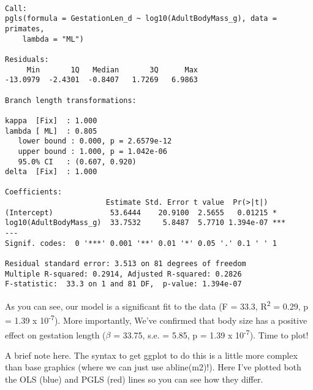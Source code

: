 \documentclass[]{book}
\begin{document}
\begin{verbatim}

Call:
pgls(formula = GestationLen_d ~ log10(AdultBodyMass_g), data = primates, 
    lambda = "ML")

Residuals:
     Min       1Q   Median       3Q      Max 
-13.0979  -2.4301  -0.8407   1.7269   6.9863 

Branch length transformations:

kappa  [Fix]  : 1.000
lambda [ ML]  : 0.805
   lower bound : 0.000, p = 2.6579e-12
   upper bound : 1.000, p = 1.042e-06
   95.0% CI   : (0.607, 0.920)
delta  [Fix]  : 1.000

Coefficients:
                       Estimate Std. Error t value  Pr(>|t|)    
(Intercept)             53.6444    20.9100  2.5655   0.01215 *  
log10(AdultBodyMass_g)  33.7532     5.8487  5.7710 1.394e-07 ***
---
Signif. codes:  0 '***' 0.001 '**' 0.01 '*' 0.05 '.' 0.1 ' ' 1

Residual standard error: 3.513 on 81 degrees of freedom
Multiple R-squared: 0.2914, Adjusted R-squared: 0.2826 
F-statistic:  33.3 on 1 and 81 DF,  p-value: 1.394e-07 
\end{verbatim}

As you can see, our model is a significant fit to the data (F = 33.3,
R\textsuperscript{2} = 0.29, p = 1.39 x 10\textsuperscript{-7}). More
importantly, We've confirmed that body size has a positive effect on
gestation length (\(\beta\) = 33.75, s.e. = 5.85, p = 1.39 x
10\textsuperscript{-7}). Time to plot!

A brief note here. The syntax to get ggplot to do this is a little more
complex than base graphics (where we can just use abline(m2)!). Here
I've plotted both the OLS (blue) and PGLS (red) lines so you can see how
they differ.
\end{document}
